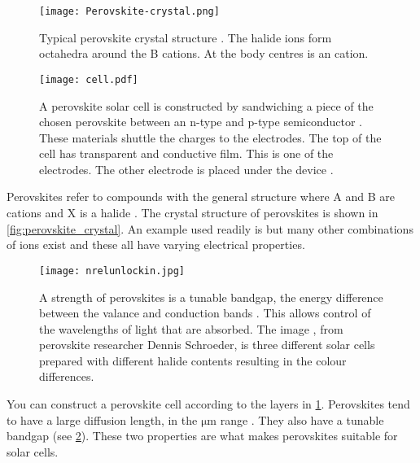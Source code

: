 \documentclass{physics_article_B}
\begin{document}
\begin{figure}[H]
 \centering
 \begin{minipage}{0.45\textwidth}
 \centering
 \texttt{[image: Perovskite-crystal.png]}
 \caption{Typical perovskite  crystal structure \cite{noauthor_figure_nodate}. The  halide ions form octahedra around the B cations. At the body centres is an  cation. }
 \label{fig:perovskite_crystal}
 \end{minipage}
 \hfill
 \begin{minipage}{0.45\textwidth}
 \centering
 \texttt{[image: cell.pdf]}
 \caption{A perovskite solar cell is constructed by sandwiching a piece of the chosen perovskite between an n-type and p-type semiconductor \cite{zhang_device_2017}. These materials shuttle the charges to the electrodes. The top of the cell has transparent and conductive film. This is one of the electrodes. The other electrode is placed under the device \cite{extance_reality_2019}.}
 \label{fig:cell_design}
 \end{minipage}
\end{figure}

Perovskites refer to compounds with the general structure  where A and B are cations and X is a halide \cite{extance_reality_2019}. The crystal structure of perovskites is shown in \cref{fig:perovskite_crystal}. An example used readily is  \cite{hsiao_fundamental_2015} but many other combinations of ions exist and these all have varying electrical properties.

\begin{figure}[t]
 \centering
 \texttt{[image: nrelunlockin.jpg]}
 \caption{A strength of perovskites is a tunable bandgap, the energy difference between the valance and conduction bands \cite{saliba_cesium-containing_2016}. This allows control of the wavelengths of light that are absorbed. The image \cite{scanlon_unlocking_nodate}, from perovskite researcher Dennis Schroeder, is three different solar cells prepared with different halide contents resulting in the colour differences.}
 \label{fig:halides}
\end{figure}

You can construct a perovskite cell according to the layers in \cref{fig:cell_design}. Perovskites tend to have a large diffusion length, in the $\mathrm{\mu m}$ range \cite{saliba_cesium-containing_2016}. They also have a tunable bandgap (see \cref{fig:halides}). These two properties are what makes perovskites suitable for solar cells.
\end{document}
